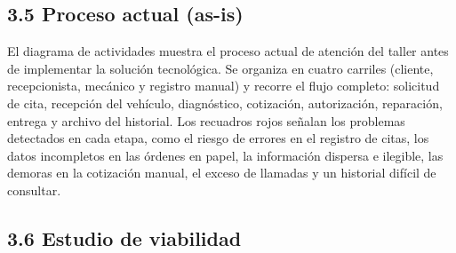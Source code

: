 \subsection{3.5 Proceso actual (as-is)}\label{proceso-actual-as-is}


El diagrama de actividades muestra el proceso actual de atención del
taller antes de implementar la solución tecnológica. Se organiza en
cuatro carriles (cliente, recepcionista, mecánico y registro manual) y
recorre el flujo completo: solicitud de cita, recepción del vehículo,
diagnóstico, cotización, autorización, reparación, entrega y archivo del
historial. Los recuadros rojos señalan los problemas detectados en cada
etapa, como el riesgo de errores en el registro de citas, los datos
incompletos en las órdenes en papel, la información dispersa e ilegible,
las demoras en la cotización manual, el exceso de llamadas y un
historial difícil de consultar.

\subsection{3.6 Estudio de viabilidad}\label{estudio-de-viabilidad}

